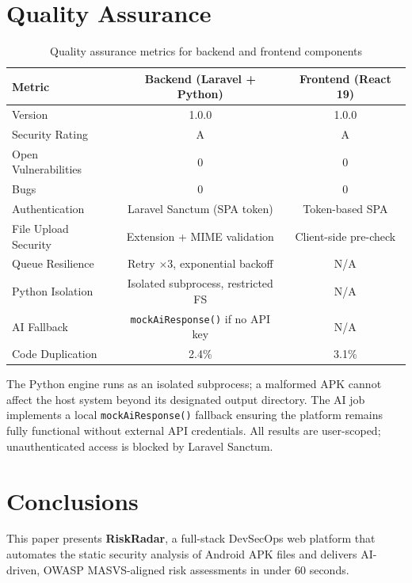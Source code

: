 \documentclass[3p,times]{elsarticle}
\begin{document}
\section{Quality Assurance}

\begin{table}[H]
\small
\renewcommand{\arraystretch}{1.3}
\begin{tabular}{|l|c|c|}
\hline
\textbf{Metric} & \textbf{Backend (Laravel + Python)} & \textbf{Frontend (React 19)} \\
\hline
Version & 1.0.0 & 1.0.0 \\
\hline
Security Rating & A & A \\
\hline
Open Vulnerabilities & 0 & 0 \\
\hline
Bugs & 0 & 0 \\
\hline
Authentication & Laravel Sanctum (SPA token) & Token-based SPA \\
\hline
File Upload Security & Extension + MIME validation & Client-side pre-check \\
\hline
Queue Resilience & Retry $\times$3, exponential backoff & N/A \\
\hline
Python Isolation & Isolated subprocess, restricted FS & N/A \\
\hline
AI Fallback & \texttt{mockAiResponse()} if no API key & N/A \\
\hline
Code Duplication & 2.4\% & 3.1\% \\
\hline
\end{tabular}
\caption{Quality assurance metrics for backend and frontend components}
\end{table}

The Python engine runs as an isolated subprocess; a malformed APK cannot
affect the host system beyond its designated output directory. The AI job
implements a local \texttt{mockAiResponse()} fallback ensuring the platform
remains fully functional without external API credentials. All results are
user-scoped; unauthenticated access is blocked by Laravel Sanctum.

\section{Conclusions}

This paper presents \textbf{RiskRadar}, a full-stack DevSecOps web platform
that automates the static security analysis of Android APK files and delivers
AI-driven, OWASP MASVS-aligned risk assessments in under 60 seconds.
\end{document}
